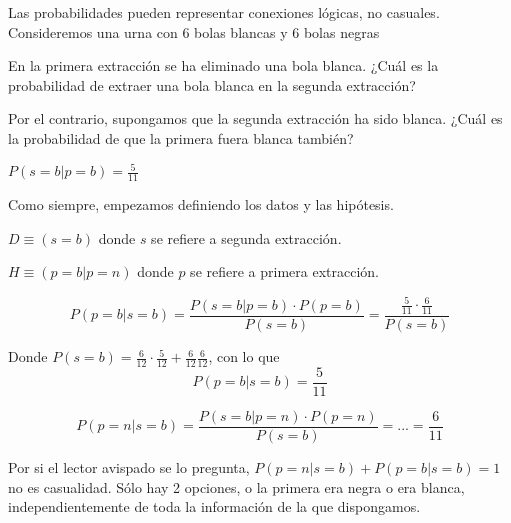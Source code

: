 \begin{problem}[2]
Las probabilidades pueden representar conexiones lógicas, no casuales. Consideremos una urna con 6 bolas blancas y 6 bolas negras

\ppart En la primera extracción se ha eliminado una bola blanca. ¿Cuál es la probabilidad de extraer una bola blanca en la segunda extracción?

\ppart Por el contrario, supongamos que la segunda extracción ha sido blanca. ¿Cuál es la probabilidad de que la primera fuera blanca también?

\solution

\spart $P(s=b|p=b) = \frac{5}{11}$

\spart Como siempre, empezamos definiendo los datos y las hipótesis.

$D\equiv (s=b)$ donde $s$ se refiere a segunda extracción.

$H\equiv (p=b|p=n)$ donde $p$ se refiere a primera extracción.

\[P(p=b|s=b) = \frac{P(s=b|p=b)·P(p=b)}{P(s=b)} = \frac{\frac{5}{11}·\frac{6}{11}}{P(s=b)}\]

Donde $P(s=b) = \frac{6}{12}·\frac{5}{12}+\frac{6}{12}\frac{6}{12}$, con lo que 
\[P(p=b|s=b) = \frac{5}{11}\]

\[P(p=n|s=b) = \frac{P(s=b|p=n)·P(p=n)}{P(s=b)} = ... = \frac{6}{11} \]

Por si el lector avispado se lo pregunta, $P(p=n|s=b) + P(p=b|s=b) = 1$ no es casualidad. Sólo hay 2 opciones, o la primera era negra o era blanca, independientemente de toda la información de la que dispongamos. 

\end{problem}

